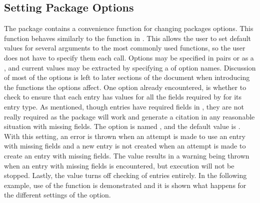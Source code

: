 \documentclass[article]{jss}\usepackage[]{graphicx}\usepackage[]{color}
\begin{document}
\subsection{Setting Package Options}
The package contains a convenience function  for changing packages options.  This function behaves similarly to the  function in .  This allows the user to set default values for several arguments to the most commonly used functions, so the user does not have to specify them each call.  Options may be specified in  pairs or as a , and current values may be extracted by specifying a  of option names.  Discussion of most of the options is left to later sections of the document when introducing the functions the options affect.  One option already encountered, is whether to check to ensure that each entry has values for all the fields required by \Biblatex{} for its entry type.  As mentioned, though entries have required fields in \Biblatex{}, they are not really required as the package will work and generate a citation in any reasonable situation with missing fields.  The option is named , and the default value is .  With this setting, an error is thrown when an attempt is made to use an entry with missing fields and a new entry is not created when an attempt is made to create an entry with missing fields.  The value  results in a warning being thrown when an entry with missing fields is encountered, but execution will not be stopped.  Lastly, the value  turns off checking of entries entirely.  In the following example, use of the  function is demonstrated and it is shown what happens for the different settings of the  option.
\end{document}
